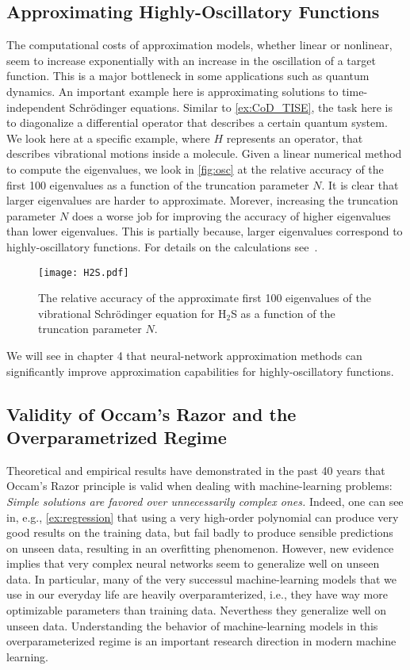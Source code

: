 \subsection{Approximating Highly-Oscillatory Functions}
The computational costs of approximation models, whether linear or nonlinear,
seem to increase exponentially with an increase in the oscillation of a target
function. This is a major bottleneck in some applications such as quantum
dynamics. An important example here is approximating solutions to
time-independent Schrödinger equations. Similar to \autoref{ex:CoD_TISE}, the
task here is to diagonalize a differential operator that describes a certain
quantum system. We look here at a specific example, where $H$ represents an
operator, that describes vibrational motions inside a molecule. Given a linear
numerical method to compute the eigenvalues, we look in \autoref{fig:osc} at the
relative accuracy of the
first 100 eigenvalues as a function of the truncation parameter $N$. It is clear
that larger eigenvalues are harder to approximate. Morever, increasing the
truncation parameter $N$ does a worse job for improving the accuracy of higher
eigenvalues than lower eigenvalues. This is partially because, larger
eigenvalues correspond to highly-oscillatory functions. For details on the
calculations see~\cite{Saleh:arXiv2308}.

\begin{figure}[htbp]
    \centering
    \texttt{[image: H2S.pdf]}
    \caption{The relative accuracy of the approximate first 100 eigenvalues of the vibrational Schrödinger equation for H$_2$S as a function of the truncation parameter $N$.}
    \label{fig:osc}
\end{figure}   
We will see in chapter 4 that neural-network approximation methods can
significantly improve approximation capabilities for highly-oscillatory functions.
\subsection{Validity of Occam's Razor and the Overparametrized Regime}
Theoretical and empirical results have demonstrated in the past 40 years that
Occam's Razor principle is valid when dealing with machine-learning problems:
\emph{Simple solutions are favored over unnecessarily complex ones.} Indeed,
one can see in, e.g., \autoref{ex:regression} that using a very high-order
polynomial can produce very good results on the training data, but fail badly to
produce sensible predictions on unseen data, resulting in an overfitting
phenomenon. However, new evidence implies that very complex neural networks seem
to generalize well on unseen data. In particular, many of the very successul
machine-learning models that we use in our everyday life are heavily
overparamterized, i.e., they have way more optimizable parameters than training
data. Neverthess they generalize well on unseen data. Understanding the
behavior of machine-learning models in this overparameterized regime is an
important research direction in modern machine learning.

